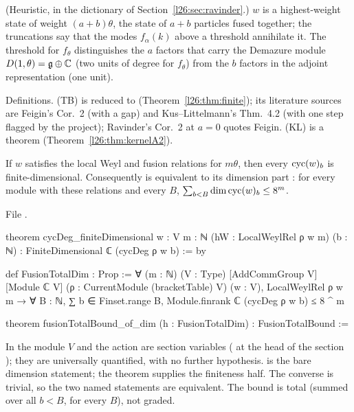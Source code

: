 \begin{physics}
(Heuristic, in the dictionary of Section~\ref{l26:sec:ravinder}.) $w$ is a highest-weight state of weight $(a+b)\theta$, the state
of $a+b$ particles fused together; the truncations say that the modes $f_\alpha(k)$ above a threshold annihilate it.
The threshold for $f_\theta$ distinguishes the $a$ factors that carry the Demazure module $D(1,\theta)=\mathfrak g\oplus{\mathbb{C}}$
(two units of degree for $f_\theta$) from the $b$ factors in the adjoint representation (one unit).
\end{physics}

\begin{status}
Definitions. (TB) is reduced to  (Theorem~\ref{l26:thm:finite}); its literature sources are Feigin's Cor.~2
(with a gap) and Kus--Littelmann's Thm.~4.2 (with one step flagged by the project); Ravinder's Cor.~2 at $a=0$ quotes Feigin. (KL) is a theorem (Theorem~\ref{l26:thm:kernelA2}).
\end{status}

\begin{theorem}\label{l26:thm:finite}
If $w$ satisfies the local Weyl and fusion relations for $m\theta$, then every $\operatorname{cyc}(w)_b$ is
finite-dimensional. Consequently  is equivalent to its dimension part : for
every module with these relations and every $B$, $\sum_{b<B}\dim\operatorname{cyc}(w)_b\le8^m$.
\end{theorem}
\noindent File .
\begin{leancode}
theorem cycDeg_finiteDimensional {w : V} {m : ℕ} (hW : LocalWeylRel ρ w m) (b : ℕ) :
    FiniteDimensional ℂ (cycDeg ρ w b) := by

def FusionTotalDim : Prop :=
  ∀ (m : ℕ) (V : Type) [AddCommGroup V] [Module ℂ V] (ρ : CurrentModule (bracketTable) V) (w : V),
    LocalWeylRel ρ w m → ∀ B : ℕ, ∑ b ∈ Finset.range B, Module.finrank ℂ (cycDeg ρ w b) ≤ 8 ^ m

theorem fusionTotalBound_of_dim (h : FusionTotalDim) : FusionTotalBound :=
\end{leancode}

\begin{dictionary}
In  the module $V$ and the action  are
section variables ( at the head of the section ); they are
universally quantified, with no further hypothesis.  is the bare dimension statement; the theorem
 supplies the finiteness half. The converse is trivial, so the two named statements are
equivalent. The bound is total (summed over all $b<B$, for every $B$), not graded.
\end{dictionary}

